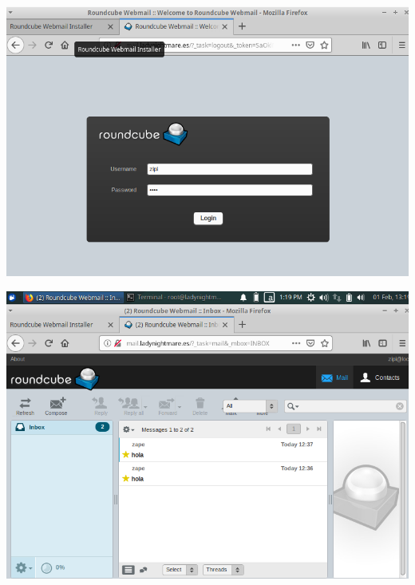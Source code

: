 \documentclass{article}
\begin{document}
\begin{center}
\includegraphics[scale=0.4]{images/login.png}
\end{center}

\begin{center}
\includegraphics[scale=0.4]{images/last.png}
\end{center}
\end{document}
